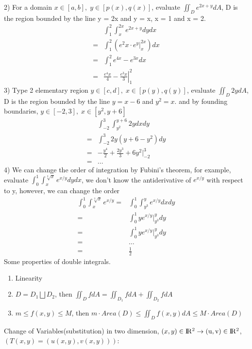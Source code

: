 \documentclass{article}
\newcommand{\R}{\rm I\!R}
\begin{document}
        2) For a domain $x \in [a,b],\;y\in[p(x),q(x)]$, evaluate $\iint_D e^{2x+y}dA$, D is the region bounded by the line y = 2x and y = x, x = 1 and x = 2.
        \begin{align}
            &\int^2_1 \int^{2x}_{x} e^{2x+y} dy dx\\
            =& \int^2_1 (e^2x\cdot e^y |^{2x}_{x}) dx\\
            =& \int^2_1 e^{4x}-e^{3x} dx\\
            =& \left.\frac{e^4x}{4} - \frac{e^3x}{3} \right|^2_1
        \end{align}
        3) Type 2 elementary region $y\in[c,d],\; x\in[p(y),q(y)]$, evaluate $\iint_D 2ydA$, D is the region bounded by the line $y = x-6$ and $y^2 = x$. and by founding boundaries, $y\in[-2,3],\;x\in[y^2, y + 6]$
        \begin{align}
            &\int^3_{-2} \int^{y+6}_{y^2} 2y dx dy\\
            =& \int^3_{-2} 2y(y+6-y^2) dy\\
            =& -\frac{y^4}{2} + \frac{2y^3}{3}+6y^2|^3_{-2}\\
            =& ...
        \end{align}
        4) We can change the order of integration by Fubini's theorem, for example, evaluate $\int^{1}_{0} \int^{\sqrt[3]{x}}_{x} e^{x/y}dydx$, we don't know the antiderivative of $e^{x/y}$ with respect to y, however, we can change the order
        \begin{align}
            \int^{1}_{0} \int^{\sqrt[3]{x}}_{x} e^{x/y} =& \int^{1}_{0} \int^{y}_{y^3} e^{x/y}dxdy\\
            =& \int^{1}_{0} ye^{x/y}|^y_{y^3} dy\\
            =& \int^{1}_{0} ye^{x/y}|^y_{y^3} dy\\
            =& \dots\\
            =& \frac{1}{2}
        \end{align}
        Some properties of double integrals.
        \begin{enumerate}
            \item Linearity
            \item $D = D_1\bigsqcup D_2$, then $\iint_D f dA = \iint_{D_1} f dA + \iint_{D_2} f dA$
            \item $m\leq f(x,y)\leq M$, then $m\cdot Area(D)\leq\iint_D f(x,y)dA\leq M\cdot Area(D)$
        \end{enumerate}
        Change of Variables(substitution) in two dimension, $(x,y)\in \R^2 \rightarrow (u,v) \in \R^2$, $(T(x,y) = (u(x,y),v(x,y)))$:
\end{document}
